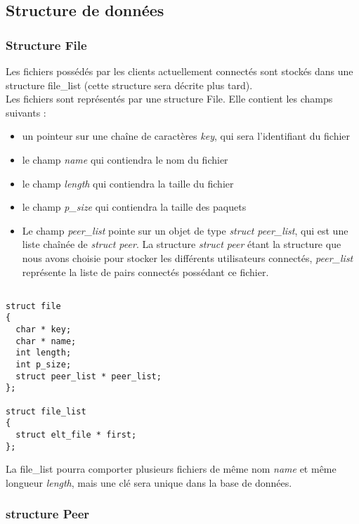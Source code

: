 
\subsection{Structure de données}

\subsubsection{Structure File}
Les fichiers possédés par les clients actuellement connectés sont stockés dans une structure file\_list (cette structure sera décrite plus tard). \\


Les fichiers sont représentés par une structure File. Elle contient les champs suivants : 

\begin{itemize}
\item un pointeur sur une chaîne de caractères \textit{key}, qui sera l'identifiant du fichier
\item le champ \textit{name} qui contiendra le nom du fichier
\item le champ \textit{length} qui contiendra la taille du fichier
\item le champ \textit{p\_size} qui contiendra la taille des paquets
\item Le champ \textit{peer\_list} pointe sur un objet de type \textit{struct peer\_list}, qui est une liste chaînée de \textit{struct peer}. La structure \textit{struct peer} étant la structure que nous avons choisie pour stocker les différents utilisateurs connectés, \textit{peer\_list} représente la liste de pairs connectés possédant ce fichier.
\end{itemize}
 
\begin{verbatim}

struct file
{
  char * key;
  char * name;
  int length;
  int p_size;
  struct peer_list * peer_list; 
};

struct file_list
{
  struct elt_file * first;
};

\end{verbatim}
La file\_list pourra comporter plusieurs fichiers de même nom \textit{name} et même longueur \textit{length}, mais une clé sera unique dans la base de données.
\subsubsection{structure Peer}
  
